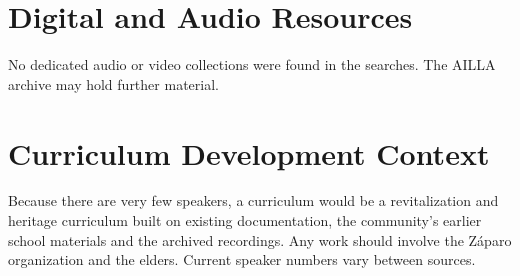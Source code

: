 \documentclass[12pt]{article}
\begin{document}
\section{Digital and Audio Resources}
No dedicated audio or video collections were found in the searches. The AILLA archive may hold further material.

\section{Curriculum Development Context}
Because there are very few speakers, a curriculum would be a revitalization and heritage curriculum built on existing documentation, the community's earlier school materials and the archived recordings. Any work should involve the Z\'aparo organization and the elders. Current speaker numbers vary between sources.
\end{document}
